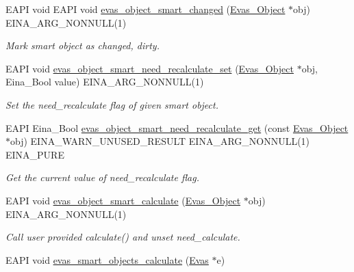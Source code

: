 \begin{DoxyCompactItemize}
EAPI void EAPI void \hyperlink{group__Evas__Smart__Object__Group_ga20b3bce805c272f3d11f4ba0ae952dc6}{evas\_\-object\_\-smart\_\-changed} (\hyperlink{group__Evas__Object__Group_ga9e19e6dd1f517a0ba437c0114d3e7c97}{Evas\_\-Object} $\ast$obj) EINA\_\-ARG\_\-NONNULL(1)
\begin{DoxyCompactList}\small\item\em Mark smart object as changed, dirty. \item\end{DoxyCompactList}\item 
EAPI void \hyperlink{group__Evas__Smart__Object__Group_ga58c34092eac9bfe6878b8e6ebc026de1}{evas\_\-object\_\-smart\_\-need\_\-recalculate\_\-set} (\hyperlink{group__Evas__Object__Group_ga9e19e6dd1f517a0ba437c0114d3e7c97}{Evas\_\-Object} $\ast$obj, Eina\_\-Bool value) EINA\_\-ARG\_\-NONNULL(1)
\begin{DoxyCompactList}\small\item\em Set the need\_\-recalculate flag of given smart object. \item\end{DoxyCompactList}\item 
EAPI Eina\_\-Bool \hyperlink{group__Evas__Smart__Object__Group_ga38be19a4f09b071b3d984996b8f9b3ee}{evas\_\-object\_\-smart\_\-need\_\-recalculate\_\-get} (const \hyperlink{group__Evas__Object__Group_ga9e19e6dd1f517a0ba437c0114d3e7c97}{Evas\_\-Object} $\ast$obj) EINA\_\-WARN\_\-UNUSED\_\-RESULT EINA\_\-ARG\_\-NONNULL(1) EINA\_\-PURE
\begin{DoxyCompactList}\small\item\em Get the current value of need\_\-recalculate flag. \item\end{DoxyCompactList}\item 
EAPI void \hyperlink{group__Evas__Smart__Object__Group_ga8013936b96d99d2ff375ca2b0b287f39}{evas\_\-object\_\-smart\_\-calculate} (\hyperlink{group__Evas__Object__Group_ga9e19e6dd1f517a0ba437c0114d3e7c97}{Evas\_\-Object} $\ast$obj) EINA\_\-ARG\_\-NONNULL(1)
\begin{DoxyCompactList}\small\item\em Call user provided calculate() and unset need\_\-calculate. \item\end{DoxyCompactList}\item 
EAPI void \hyperlink{group__Evas__Smart__Object__Group_gaa30fa648297b723a73f28632d1dbec62}{evas\_\-smart\_\-objects\_\-calculate} (\hyperlink{group__Evas__Canvas_ga5ff87cc4ce6bc43e3b640a6d37f73043}{Evas} $\ast$e)

\end{DoxyCompactItemize}

